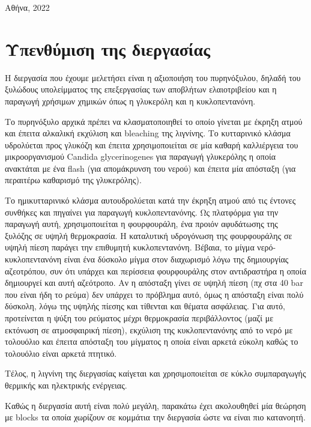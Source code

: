 \documentclass[11pt]{article}
\begin{document}
\begin{titlepage}
\begin{center}
  \vfill
  {\large Αθήνα, 2022}
\end{center}

\end{titlepage}

\tableofcontents
\pagebreak

\section{Υπενθύμιση της διεργασίας}
\label{sec:orgefb165f}
Η διεργασία που έχουμε μελετήσει είναι η αξιοποιήση του πυρηνόξυλου, δηλαδή του ξυλώδους υπολείμματος της επεξεργασίας των αποβλήτων ελαιοτριβείου και η παραγωγή χρήσιμων χημικών όπως η γλυκερόλη και η κυκλοπεντανόνη.

Το πυρηνόξυλο αρχικά πρέπει να κλασματοποιηθεί το οποίο γίνεται με έκρηξη ατμού και έπειτα αλκαλική εκχύλιση και bleaching της λιγνίνης. Το κυτταρινικό κλάσμα υδρολύεται προς γλυκόζη και έπειτα χρησιμοποιείται σε μία καθαρή καλλιέργεια του μικροοργανισμού Candida glycerinogenes για παραγωγή γλυκερόλης η οποία ανακτάται με ένα flash (για απομάκρυνση του νερού) και έπειτα μία απόσταξη (για περαιτέρω καθαρισμό της γλυκερόλης).

Το ημικυτταρινικό κλάσμα αυτουδρολύεται κατά την έκρηξη ατμού από τις έντονες συνθήκες και πηγαίνει για παραγωγή κυκλοπεντανόνης. Ως πλατφόρμα για την παραγωγή αυτή, χρησιμοποιείται η φουρφουράλη, ένα προιόν αφυδάτωσης της ξυλόζης σε υψηλή θερμοκρασία. Η καταλυτική υδρογόνωση της φουρφουράλης σε υψηλή πίεση παράγει την επιθυμητή κυκλοπεντανόνη. Βέβαια, το μίγμα νερό-κυκλοπεντανόνη είναι ένα δύσκολο μίγμα στον διαχωρισμό λόγω της δημιουργίας αζεοτρόπου, συν ότι υπάρχει και περίσσεια φουρφουράλης στον αντιδραστήρα η οποία δημιουργεί και αυτή αζεότροπο. Αν η απόσταξη γίνει σε υψηλή πίεση (πχ στα 40 bar που είναι ήδη το ρεύμα) δεν υπάρχει το πρόβλημα αυτό, όμως η απόσταξη είναι πολύ δύσκολη, λόγω της υψηλής πίεσης και τίθενται και θέματα ασφάλειας. Για αυτό, προτείνεται η ψύξη του ρεύματος μέχρι θερμοκρασία περιβάλλοντος (μαζί με εκτόνωση σε ατμοσφαιρική πίεση), εκχύλιση της κυκλοπεντανόνης από το νερό με τολουόλιο και έπειτα απόσταξη του μίγματος η οποία είναι αρκετά εύκολη καθώς το τολουόλιο είναι αρκετά πτητικό.

Τέλος, η λιγνίνη της διεργασίας καίγεται και χρησιμοποιείται σε κύκλο συμπαραγωγής θερμικής και ηλεκτρικής ενέργειας.

Καθώς η διεργασία αυτή είναι πολύ μεγάλη, παρακάτω έχει ακολουθηθεί μία θεώρηση με blocks τα οποία χωρίζουν σε κομμάτια την διεργασία ώστε να είναι πιο κατανοητή.
\end{document}
